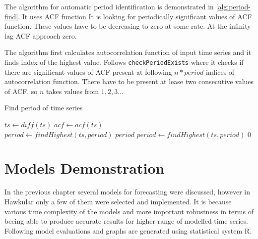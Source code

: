     The algorithm for automatic period identification is demonstrated in \ref{alg:period-find}. It uses ACF function
    It is looking for periodically significant values of ACF function. These values have to be decreasing to zero at
    some rate. At the infinity lag ACF approach zero.

    The algorithm first calculates autocorrelation function of input time series and it finds index of the highest
    value. Follows \texttt{checkPeriodExists} where it checks if there are significant values of ACF present at following $n*period$
    indices of autocorrelation function. There have to be present at lease two consecutive values of ACF, so $n$ takes
    values from $1,2,3\dots$

    \begin{algorithm}
        \caption{Find period of time series} \label{alg:period-find}
        \begin{algorithmic}[1]
             
                \State $ts \gets diff(ts)$ 
            \EndIf
            \State $acf \gets acf(ts)$ \\
            \State $period \gets findHighest(ts, period)$
                    \State \Return $period$
                \EndIf
                $period \gets findHighest(ts, period)$
            \EndWhile
            \State \Return $0$
        \EndFunction
        \end{algorithmic}
    \end{algorithm}


\chapter{Models Demonstration}
In the previous chapter several models for forecasting were discussed, however in Hawkular only a few of them were
selected and implemented. It is because various time complexity of the models and more important robustness in terms of
beeing able to produce accurate results for higher range of modelled time series.
Following model evaluations and graphs are generated using statistical system R.

